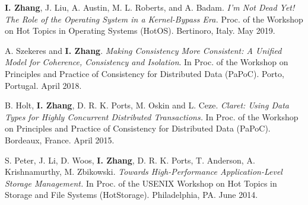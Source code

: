 \documentclass[10pt,times]{report}
\newlength{\sectiongap}
\newlength{\sectioncolwidth}
\newlength{\colgap}
\newlength{\stuffwidth}
\newenvironment{rtable}{
  \begin{minipage}{\textwidth}
  }{
  \end{minipage}
}
\newenvironment{rsection}[1]{
  \begin{minipage}[t]{\sectioncolwidth}
    \textsc{#1}
  \end{minipage}
  \hspace{\colgap}
  \begin{minipage}[t]{\stuffwidth}
  }{
    \removelastskip
  \end{minipage}
  \\[\sectiongap]
}
\begin{document}
\begin{rtable}
  \begin{rsection}{}
    
    \textbf{I. Zhang}, J. Liu, A. Austin, M.  L. Roberts, and
    A. Badam.  \textit{I'm Not Dead Yet! The Role of the Operating
      System in a Kernel-Bypass Era. } Proc. of the Workshop on
    Hot Topics in Operating Systems (HotOS). Bertinoro, Italy. May
    2019.
    \\\vspace{-0.5em}
    
    A. Szekeres and \textbf{I. Zhang}. \textit{Making Consistency More
      Consistent: A Unified Model for Coherence, Consistency and
      Isolation}. In Proc. of the Workshop on Principles and
    Practice of Consistency for Distributed Data (PaPoC). Porto,
    Portugal. April 2018. \\\vspace{-0.5em}

    B. Holt, \textbf{I. Zhang}, D. R. K. Ports, M. Oskin and L. Ceze.
    \textit{Claret: Using Data Types for Highly Concurrent Distributed
      Transactions.} In Proc. of the Workshop on Principles and
    Practice of Consistency for Distributed Data (PaPoC).  Bordeaux,
    France. April 2015.\\\vspace{-0.5em}

    S. Peter, J. Li, D. Woos, \textbf{I. Zhang}, D. R. K. Ports,
    T. Anderson, A. Krishnamurthy, M. Zbikowski. \textit{Towards
      High-Performance Application-Level Storage Management.} In
    Proc. of the USENIX Workshop on Hot Topics in Storage and
    File Systems (HotStorage). Philadelphia, PA. June
    2014.
   \end{rsection}


\end{rtable}
\end{document}
